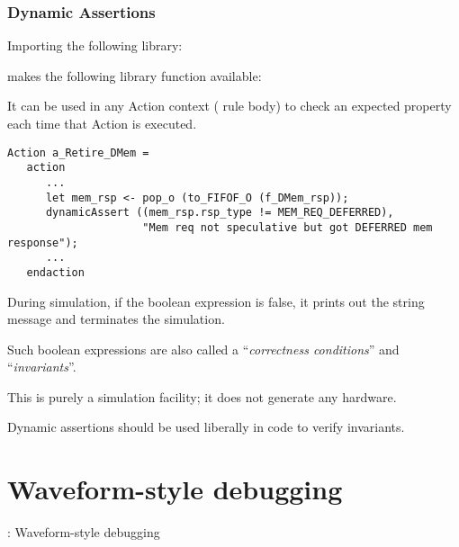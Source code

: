 
\begin{frame}[fragile]
\frametitle{Dynamic Assertions}

\footnotesize

\begin{minipage}{0.38\textwidth}
Importing the following {\bsc} library:
\end{minipage}

\vx

\begin{minipage}{0.38\textwidth}
makes the following library function available:
\end{minipage}

\vxx

It can be used in any Action context ({\eg} rule body) to check an
expected property each time that Action is executed.  {\Eg}

\vx

{\scriptsize
\begin{Verbatim}[frame=single, label=src\_Drum/CPU.bsv]
   Action a_Retire_DMem =
   action
      ...
      let mem_rsp <- pop_o (to_FIFOF_O (f_DMem_rsp));
      dynamicAssert ((mem_rsp.rsp_type != MEM_REQ_DEFERRED),
                     "Mem req not speculative but got DEFERRED mem response");
      ...
   endaction
\end{Verbatim}
}

During simulation, if the boolean expression is false, it prints out
the string message and terminates the simulation.

\vx
Such boolean expressions are also called a ``\emph{correctness
conditions}'' and ``\emph{invariants}''.

\vx
This is purely a simulation facility; it does not generate any hardware.

\vx
Dynamic assertions should be used liberally in {\BSV} code to verify invariants.

\end{frame}


\section{Waveform-style debugging}

\begin{frame}

\begin{center}
  {\LARGE {\BSV}: Waveform-style debugging}
\end{center}

\end{frame}


